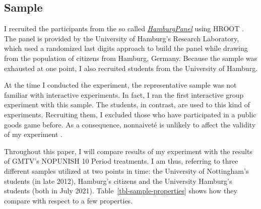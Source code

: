 \documentclass[
  authoryear,
  preprint,
  3p]{elsarticle}
\begin{document}
\hypertarget{sec-sample}{%
\subsection{Sample}\label{sec-sample}}

I recruited the participants from the so called
\emph{\href{https://www.wiso.uni-hamburg.de/forschung/forschungslabor/umfragelabor/aktuelle-umfragen/hamburgpanel.html}{HamburgPanel}}
using HROOT \citep{hroot}. The panel is provided by the University of
Hamburg's Research Laboratory, which used a randomized last digits
approach to build the panel while drawing from the population of
citizens from Hamburg, Germany. Because the sample was exhausted at one
point, I also recruited students from the University of Hamburg.

At the time I conducted the experiment, the representative sample was
not familiar with interactive experiments. In fact, I ran the first
interactive group experiment with this sample. The students, in
contrast, are used to this kind of experiments. Recruiting them, I
excluded those who have participated in a public goods game before. As a
consequence, nonnaiveté is unlikely to affect the validity of my
experiment \citep[ p.~204]{GoodmanPaolacci2017}.

Throughout this paper, I will compare results of my experiment with the
results of GMTV's NOPUNISH 10 Period treatments. I am thus, referring to
three different samples utilized at two points in time: the University
of Nottingham's students (in late 2012), Hamburg's citizens and the
University Hamburg's students (both in July 2021).
Table~\ref{tbl-sample-properties} shows how they compare with respect to
a few properties.
\end{document}
